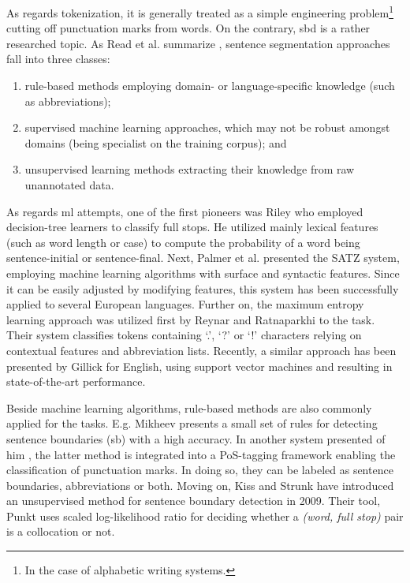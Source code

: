 As regards tokenization, it is generally treated as a simple engineering problem\footnote{In the case of alphabetic writing systems.} cutting off punctuation marks from words. 
On the contrary, \acrshort{sbd} is a rather researched topic. 
As Read et al. summarize \cite{read2012sentence}, sentence segmentation approaches fall into three classes: 
\begin{enumerate}
 \item rule-based methods employing domain- or language-specific knowledge (such as abbreviations); 
 \item supervised machine learning approaches, which may not be robust amongst domains (being specialist on the training corpus); and
 \item unsupervised learning methods extracting their knowledge from raw unannotated data. 
\end{enumerate}

As regards \acrshort{ml} attempts, one of the first pioneers was Riley \cite{riley1989some} who employed decision-tree learners to classify full stops. 
He utilized mainly lexical features (such as word length or case) to compute the probability of a word being sentence-initial or sentence-final. 
Next, Palmer et al. presented \cite{palmer1997adaptive} the SATZ system, employing machine learning algorithms with surface and syntactic features. 
Since it can be easily adjusted by modifying features, this system has been successfully applied to several European languages. 
Further on, the maximum entropy learning approach was utilized first by Reynar and Ratnaparkhi \cite{reynar1997maximum} to the task. 
Their system classifies tokens containing `.', `?' or `!' characters relying on contextual features and abbreviation lists. 
Recently, a similar approach has been presented by Gillick \cite{gillick2009sentence} for English, using support vector machines and resulting in state-of-the-art performance.

Beside machine learning algorithms, rule-based methods are also commonly applied for the tasks. 
E.g. Mikheev presents \cite{mikheev2002periods} a small set of rules for detecting sentence boundaries (\acrshort{sb}) with a high accuracy. 
In another system presented of him \cite{mikheev2000tagging}, the latter method is integrated into a PoS-tagging framework enabling the classification of punctuation marks. 
In doing so, they can be labeled as sentence boundaries, abbreviations or both. 
Moving on, Kiss and Strunk have introduced \cite{kiss2006unsupervised} an unsupervised method for sentence boundary detection in 2009. 
Their tool, Punkt uses scaled log-likelihood ratio for deciding whether a \emph{(word, full stop)} pair is a collocation or not.

